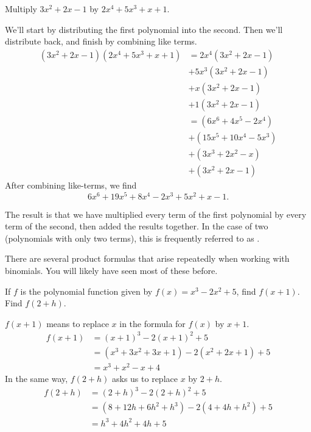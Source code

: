 \documentclass{ximera}
\begin{document}
\begin{example}
	Multiply $3x^2 + 2x - 1$ by $2x^4 + 5x^3+ x + 1$.
	\begin{explanation}
		We'll start by distributing the first polynomial into the second.  Then we'll distribute back, and finish by combining like terms.
		\begin{align*}
			(3x^2+ 2x-1)(2x^4 + 5x^3 + x +1) &= 2x^4(3x^2+ 2x-1) \\
			 &+ 5x^3 (3x^2+ 2x-1) \\
			 &+ x (3x^2+ 2x-1) \\
			 &+ 1(3x^2+ 2x-1)\\
				&= (6x^6 + 4x^5 - 2x^4) \\
				&+ (15x^5 + 10x^4 - 5x^3) \\
				&+ (3x^3+2x^2-x) \\
				&+(3x^2+2x-1)
		\end{align*}
		After combining like-terms, we find \[6x^6 + 19x^5 +8x^4 - 2x^3 + 5x^2+ x - 1.\]
	\end{explanation}
\end{example}
The result is that we have multiplied every term of the first polynomial by every term of the second, then added the results together.  In the case of two
 (polynomials with only two terms), this is frequently referred to as .

There are several product formulas that arise repeatedly when working with binomials.  You will likely have seen most of these before.
\noindent{}
\begin{example}
	If $f$ is the polynomial function given by $f(x) = x^3-2x^2 +5$, find $f(x+1)$.  Find $f(2+h)$.
	\begin{explanation}
		$f(x+1)$ means to replace $x$ in the formula for $f(x)$ by $x+1$.
		\begin{align*}
			f(x+1) &= (x+1)^3 - 2(x+1)^2 + 5 \\
				&= (x^3 + 3x^2 + 3x + 1) - 2(x^2 + 2x + 1) + 5\\
				&= x^3 + x^2 -x + 4
		\end{align*}
		In the same way, $f(2+h)$ asks us to replace $x$ by $2+h$.
		\begin{align*}
			f(2+h) &= (2+h)^3 - 2(2+h)^2 + 5\\
				&= (8+12h + 6h^2 + h^3) - 2(4+4h+h^2) + 5\\
				&= h^3 + 4h^2+4h+5
		\end{align*}
	\end{explanation}
\end{example}
\end{document}
